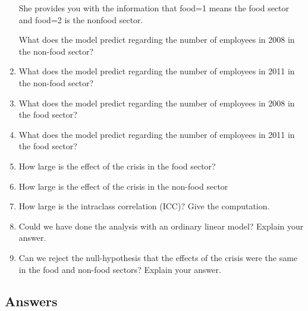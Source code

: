 \documentclass[]{book}\usepackage[]{graphicx}\usepackage[]{color}
\begin{document}
\begin{enumerate}
She provides you with the information that food=1 means the food sector and food=2 is the nonfood sector.

What does the model predict regarding the number of employees in 2008 in the non-food sector?
\item What does the model predict regarding the number of employees in 2011 in the non-food sector?
\item What does the model predict regarding the number of employees in 2008 in the food sector?
\item What does the model predict regarding the number of employees in 2011 in the food sector?
\item How large is the effect of the crisis in the food sector?
\item How large is the effect of the crisis in the non-food sector
\item How large is the intraclass correlation (ICC)? Give the computation.
\item Could we have done the analysis with an ordinary linear model? Explain your answer.
\item Can we reject the null-hypothesis that the effects of the crisis were the same in the food and non-food sectors? Explain your answer.
\end{enumerate}



\subsection{Answers}
\end{document}
